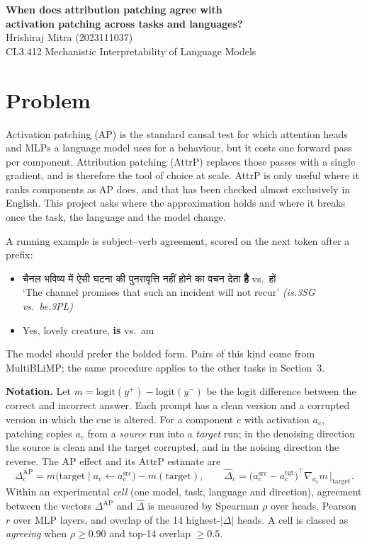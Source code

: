 \documentclass[10pt,a4paper]{article}
\newcommand{\hi}[1]{{\hindifont #1}}
\begin{document}
\begin{center}
{\Large\bfseries When does attribution patching agree with\\ activation patching across tasks and languages?}\\[0.5em]
Hrishiraj Mitra (2023111037)\\
CL3.412 Mechanistic Interpretability of Language Models
\end{center}

\section{Problem}
Activation patching (AP) is the standard causal test for which attention heads and MLPs a language model uses for a behaviour, but it costs one forward pass per component. Attribution patching (AttrP) replaces those passes with a single gradient, and is therefore the tool of choice at scale. AttrP is only useful where it ranks components as AP does, and that has been checked almost exclusively in English. This project asks where the approximation holds and where it breaks once the task, the language and the model change.

A running example is subject--verb agreement, scored on the next token after a prefix:
\begin{itemize}
  \item[(1)] \hi{चैनल भविष्य में ऐसी घटना की पुनरावृत्ति नहीं होने का वचन देता} \;\textbf{\hi{है}} vs.\ \hi{हों}\\
  {\small `The channel promises that such an incident will not recur' \textit{(is.3SG vs.\ be.3PL)}}
  \item[(2)] Yes, lovely creature, \;\textbf{is} vs.\ am
\end{itemize}
The model should prefer the bolded form. Pairs of this kind come from MultiBLiMP; the same procedure applies to the other tasks in Section~3.

\textbf{Notation.} Let $m = \mathrm{logit}(y^{+}) - \mathrm{logit}(y^{-})$ be the logit difference between the correct and incorrect answer. Each prompt has a clean version and a corrupted version in which the cue is altered. For a component $c$ with activation $a_c$, patching copies $a_c$ from a \emph{source} run into a \emph{target} run; in the denoising direction the source is clean and the target corrupted, and in the noising direction the reverse. The AP effect and its AttrP estimate are
\[
\Delta_c^{\mathrm{AP}} = m\big(\text{target} \mid a_c \leftarrow a_c^{\mathrm{src}}\big) - m(\text{target}),
\qquad
\hat\Delta_c = \big(a_c^{\mathrm{src}} - a_c^{\mathrm{tgt}}\big)^{\!\top} \nabla_{a_c} m \,\big|_{\text{target}} .
\]
Within an experimental \emph{cell} (one model, task, language and direction), agreement between the vectors $\Delta^{\mathrm{AP}}$ and $\hat\Delta$ is measured by Spearman $\rho$ over heads, Pearson $r$ over MLP layers, and overlap of the 14 highest-$|\Delta|$ heads. A cell is classed as \emph{agreeing} when $\rho \ge 0.90$ and top-14 overlap $\ge 0.5$.
\end{document}
